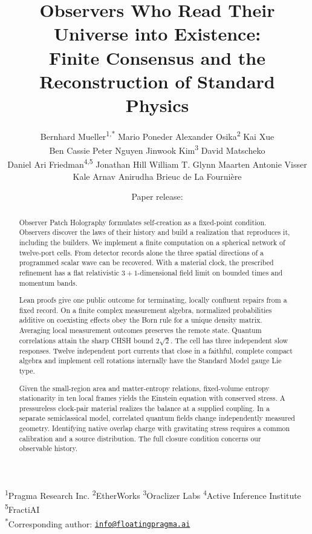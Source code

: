 \documentclass[11pt]{article}
\title{Observers Who Read Their Universe into Existence:\\
Finite Consensus and the Reconstruction of Standard Physics}
\author{%
\normalsize Bernhard Mueller\textsuperscript{1,*}\qquad
\normalsize Mario Poneder\qquad
\normalsize Alexander Osika\textsuperscript{2}\qquad
\normalsize Kai Xue\\[0.5em]
\normalsize Ben Cassie\qquad
\normalsize Peter Nguyen\qquad
\normalsize Jinwook Kim\textsuperscript{3}\qquad
\normalsize David Matscheko\\[0.5em]
\normalsize Daniel Ari Friedman\textsuperscript{4,5}\qquad
\normalsize Jonathan Hill\qquad
\normalsize William T. Glynn\qquad
\normalsize Maarten Antonie Visser\\[0.5em]
\normalsize Kale Arnav Anirudha\qquad
\normalsize Brieuc de La Fourni\`ere}
\date{\small\OPHPaperReleaseDate\quad\textperiodcentered\quad Paper release: \OPHPaperReleaseID}
\theoremstyle{definition}
\theoremstyle{remark}
\begin{document}
\maketitle

\begin{center}
\footnotesize
\textsuperscript{1}Pragma Research Inc.\quad
\textsuperscript{2}EtherWorks\quad
\textsuperscript{3}Oraclizer Labs\quad
\textsuperscript{4}Active Inference Institute\quad
\textsuperscript{5}FractiAI\\
\textsuperscript{*}Corresponding author:
\href{mailto:info@floatingpragma.ai}{\nolinkurl{info@floatingpragma.ai}}
\end{center}

\begin{abstract}
Observer Patch Holography formulates self-creation as a fixed-point
condition. Observers discover the laws of their history and build a
realization that reproduces it, including the builders. We implement
a finite computation on a spherical network of twelve-port cells.
From detector records alone the three spatial directions of a programmed
scalar wave can be recovered. With a material clock, the prescribed
refinement has a flat relativistic $3{+}1$-dimensional field limit on
bounded times and momentum bands.

Lean proofs give one public outcome for terminating, locally confluent
repairs from a fixed record. On a finite complex measurement algebra,
normalized probabilities additive on coexisting effects obey the Born
rule for a unique density matrix. Averaging local measurement outcomes
preserves the remote state. Quantum correlations attain the sharp CHSH
bound $2\sqrt{2}$. The cell has three independent slow responses. Twelve
independent port currents that close in a faithful, complete compact
algebra and implement cell rotations internally have the Standard Model
gauge Lie type.

Given the small-region area and matter-entropy relations, fixed-volume
entropy stationarity in ten local frames yields the Einstein equation
with conserved stress. A pressureless clock-pair material realizes the
balance at a supplied coupling. In a separate semiclassical model,
correlated quantum fields change independently measured geometry.
Identifying native overlap charge with gravitating stress requires a
common calibration and a source distribution. The full closure condition
concerns our observable history.

\end{abstract}
\end{document}
